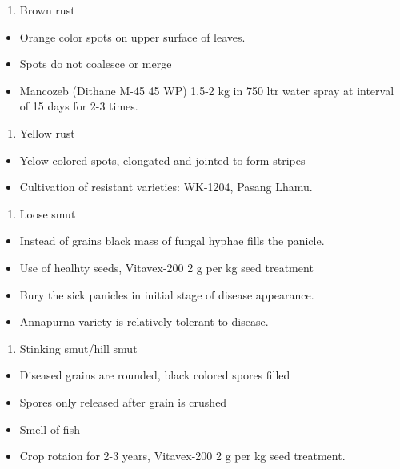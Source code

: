 \documentclass[
  openany]{book}
\providecommand{\tightlist}{%
  \setlength{\itemsep}{0pt}\setlength{\parskip}{0pt}}
\begin{document}
\begin{enumerate}
\def\labelenumi{\arabic{enumi}.}
\setcounter{enumi}{1}
\tightlist
\item
  Brown rust
\end{enumerate}

\begin{itemize}
\tightlist
\item
  Orange color spots on upper surface of leaves.
\item
  Spots do not coalesce or merge
\item
  Mancozeb (Dithane M-45 45 WP) 1.5-2 kg in 750 ltr water spray at interval of 15 days for 2-3 times.
\end{itemize}

\begin{enumerate}
\def\labelenumi{\arabic{enumi}.}
\setcounter{enumi}{2}
\tightlist
\item
  Yellow rust
\end{enumerate}

\begin{itemize}
\tightlist
\item
  Yelow colored spots, elongated and jointed to form stripes
\item
  Cultivation of resistant varieties: WK-1204, Pasang Lhamu.
\end{itemize}

\begin{enumerate}
\def\labelenumi{\arabic{enumi}.}
\setcounter{enumi}{3}
\tightlist
\item
  Loose smut
\end{enumerate}

\begin{itemize}
\tightlist
\item
  Instead of grains black mass of fungal hyphae fills the panicle.
\item
  Use of healhty seeds, Vitavex-200 2 g per kg seed treatment
\item
  Bury the sick panicles in initial stage of disease appearance.
\item
  Annapurna variety is relatively tolerant to disease.
\end{itemize}

\begin{enumerate}
\def\labelenumi{\arabic{enumi}.}
\setcounter{enumi}{4}
\tightlist
\item
  Stinking smut/hill smut
\end{enumerate}

\begin{itemize}
\tightlist
\item
  Diseased grains are rounded, black colored spores filled
\item
  Spores only released after grain is crushed
\item
  Smell of fish
\item
  Crop rotaion for 2-3 years, Vitavex-200 2 g per kg seed treatment.
\end{itemize}
\end{document}

